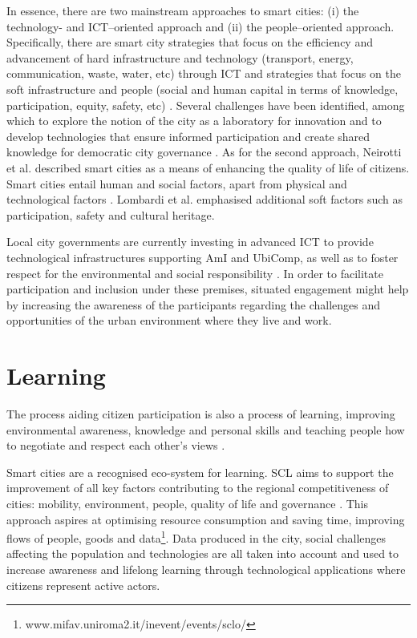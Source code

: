 In essence, there are two mainstream approaches to smart cities: (i) the technology- and ICT–oriented approach and (ii) the people–oriented approach. Specifically, there are smart city strategies that focus on the efficiency and advancement of hard infrastructure and technology (transport, energy, communication, waste, water, etc) through ICT and strategies that focus on the soft infrastructure and people (social and human capital in terms of knowledge, participation, equity, safety, etc) \autocite{angelidou_smart_2014}. Several challenges have been identified, among which to explore the notion of the city as a laboratory for innovation and to develop technologies that ensure informed participation and create shared knowledge for democratic city governance \autocite{batty_smart_2012}. As for the second approach, Neirotti et al. \autocite*{neirotti_current_2014} described smart cities as a means of enhancing the quality of life of citizens. Smart cities entail human and social factors, apart from physical and technological factors \autocite{galan-garcia_accelerated-time_2014}. Lombardi et al. \autocite*{lombardi_advanced_2012} emphasised additional soft factors such as participation, safety and cultural heritage.

Local city governments are currently investing in advanced ICT to provide technological infrastructures supporting AmI and UbiComp, as well as to foster respect for the environmental and social responsibility \autocite{solanas_smart_2014}. In order to facilitate participation and inclusion under these premises, situated engagement might help by increasing the awareness of the participants regarding the challenges and opportunities of the urban environment where they live and work.

\section{Learning}

The process aiding citizen participation is also a process of learning, improving environmental awareness, knowledge and personal skills \autocite{wilks_voice_2013} and teaching people how to negotiate and respect each other's views \autocite{corsi_child_2002}. 

Smart cities are a recognised eco-system for learning. SCL aims to support the improvement of all key factors contributing to the regional competitiveness of cities: mobility, environment, people, quality of life and governance \autocite{hollands_will_2008}. This approach aspires at optimising resource consumption and saving time, improving flows of people, goods and data\footnote{www.mifav.uniroma2.it/inevent/events/sclo/}.
Data produced in the city, social challenges affecting the population and technologies are all taken into account and used to increase awareness and lifelong learning through technological applications where citizens represent active actors.


